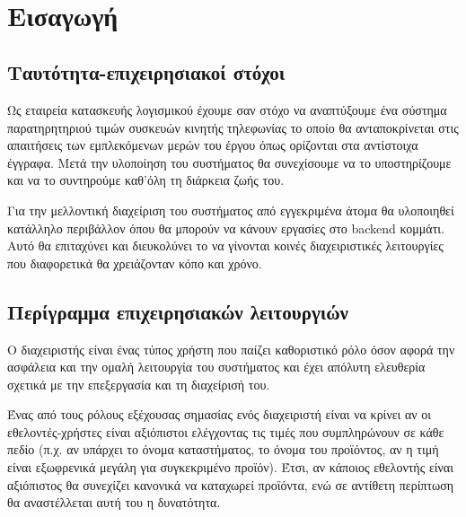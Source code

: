 \documentclass[12pt, oneside, a4paper]{report}
\begin{document}
\\
\\
\\
    \vspace{1cm}
\\
    \vspace{1cm}

\pagestyle{plain}
\normalsize
\section{Εισαγωγή}

\subsection{Ταυτότητα-επιχειρησιακοί στόχοι}
\hspace{0.6cm}Ως εταιρεία κατασκευής λογισμικού έχουμε σαν στόχο να αναπτύξουμε ένα σύστημα παρατηρητηριού τιμών συσκευών κινητής τηλεφωνίας το οποίο θα ανταποκρίνεται στις απαιτήσεις των εμπλεκόμενων μερών του έργου όπως ορίζονται στα αντίστοιχα έγγραφα. Μετά την υλοποίηση του συστήματος θα συνεχίσουμε να το υποστηρίζουμε και να το συντηρούμε καθ'όλη τη διάρκεια ζωής του. 

\hspace{0.6cm}Για την μελλοντική διαχείριση του συστήματος από εγγεκριμένα άτομα θα υλοποιηθεί κατάλληλο περιβάλλον όπου θα μπορούν να κάνουν εργασίες στο backend κομμάτι. Αυτό θα επιταχύνει και διευκολύνει το να γίνονται κοινές διαχειριστικές λειτουργίες που διαφορετικά θα χρειάζονταν κόπο και χρόνο.

\subsection{Περίγραμμα επιχειρησιακών λειτουργιών}

\hspace{0.6cm}Ο διαχειριστής είναι ένας τύπος χρήστη που παίζει καθοριστικό ρόλο όσον αφορά την ασφάλεια και την ομαλή λειτουργία του συστήματος και έχει απόλυτη ελευθερία σχετικά με την επεξεργασία και τη διαχείρισή του. 

\hspace{0.6cm}Ένας από τους ρόλους εξέχουσας σημασίας ενός διαχειριστή είναι να κρίνει αν οι εθελοντές-χρήστες είναι αξιόπιστοι ελέγχοντας τις τιμές που συμπληρώνουν σε κάθε πεδίο (π.χ. αν υπάρχει το όνομα καταστήματος, το όνομα του προϊόντος, αν η τιμή είναι εξωφρενικά μεγάλη για συγκεκριμένο προϊόν). Έτσι, αν κάποιος εθελοντής είναι αξιόπιστος θα συνεχίζει κανονικά να καταχωρεί προϊόντα, ενώ σε αντίθετη περίπτωση θα αναστέλλεται αυτή του η δυνατότητα.
\end{document}
